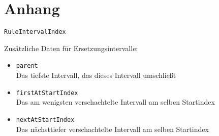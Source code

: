 \section{Anhang}

\begin{frame}{\texttt{RuleIntervalIndex}}

	Zusätzliche Daten für Ersetzungsintervalle: \begin{itemize}[leftmargin=3cm]
		\item<2->\texttt{parent}\\Das tiefste Intervall, das dieses Intervall umschließt
		\item<3->\texttt{firstAtStartIndex}\\Das am wenigsten verschachtelte Intervall am selben Startindex
		\item<4->\texttt{nextAtStartIndex}\\Das nächsttiefer verschachtelte Intervall am selben Startindex
	\end{itemize}

\end{frame}



